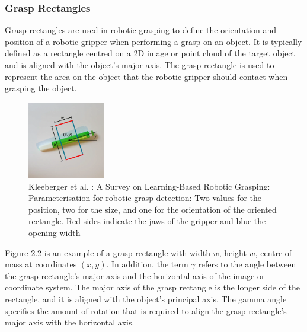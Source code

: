 \documentclass[11pt, a4paper]{report}
\begin{document}
\subsubsection{Grasp Rectangles}\label{sec:2.1.2.1}
Grasp rectangles are used in robotic grasping to define the orientation and position of a robotic gripper when performing a grasp on an object. It is typically defined as a rectangle centred on a 2D image or point cloud of the target object and is aligned with the object's major axis. The grasp rectangle is used to represent the area on the object that the robotic gripper should contact when grasping the object.
\begin{figure}[H]
    \centering
    \includegraphics[width=0.3\textwidth]{docs/Project Report/Media/2_1_2_grasp_rectangle_definition.png}
    \caption{Kleeberger et al. \cite{kleeberger2020}: A Survey on Learning-Based Robotic Grasping: Parameterisation for robotic grasp detection: Two values for the position, two for the size, and one for the orientation of the oriented rectangle. Red sides indicate the jaws of the gripper and blue the opening width}
    \label{fig:2.2}
\end{figure}
\hyperref[fig:2.2]{Figure 2.2} is an example of a grasp rectangle with width $w$, height $w$, centre of mass at coordinates $(x,y)$. In addition, the term $\gamma$ refers to the angle between the grasp rectangle's major axis and the horizontal axis of the image or coordinate system. The major axis of the grasp rectangle is the longer side of the rectangle, and it is aligned with the object's principal axis. The gamma angle specifies the amount of rotation that is required to align the grasp rectangle's major axis with the horizontal axis.\\
\end{document}
